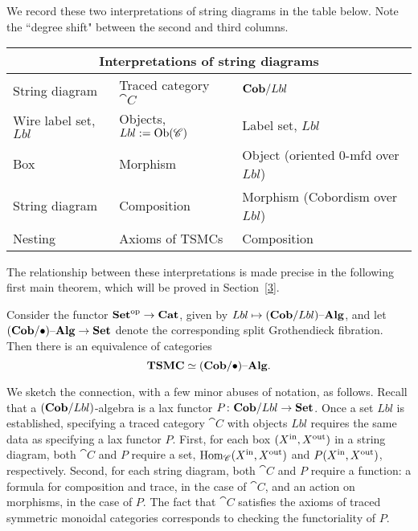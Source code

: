We record these two interpretations of string diagrams in the table below. Note the ``degree shift" between the second and third columns.
\begin{center}
\begin{tabular}{lll}
\toprule
\multicolumn{3}{c}{Interpretations of string diagrams} \\
\midrule
String diagram & Traced category $\cat{C}$ & $\mathbf{Cob}/Lbl$ \\
\midrule
Wire label set, $Lbl$ & Objects, $Lbl:=\operatorname{Ob}(\mathscr{C})$ & Label set, $Lbl$ \\
Box & Morphism & Object (oriented 0-mfd over $Lbl$) \\
String diagram & Composition & Morphism (Cobordism over $Lbl$) \\
Nesting & Axioms of TSMCs & Composition \\
\bottomrule
\end{tabular}
\end{center}

The relationship between these interpretations is made precise in the following first main theorem, which will be proved in Section~\ref{3}.
\begin{theorem}\label{thm:traced as cob-alg}
Consider the functor ${\mathbf{Set}}^{\text{op}}\to\mathbf{Cat}$, given by $Lbl\mapsto(\mathbf{Cob}/Lbl){\text \textendash}\mathbf{Alg}$, and let $(\mathbf{Cob}/\bullet){\text \textendash}\mathbf{Alg}\to\mathbf{Set}$ denote the corresponding split Grothendieck fibration. Then there is an equivalence of categories
$$\mathbf{TSMC}\simeq(\mathbf{Cob}/\bullet){\text \textendash}\mathbf{Alg}.$$
\end{theorem}

We sketch the connection, with a few minor abuses of notation, as follows. Recall that a $(\mathbf{Cob}/Lbl)$-algebra is a lax functor $P\colon\mathbf{Cob}/Lbl\to\mathbf{Set}$. Once a set $Lbl$ is established, specifying a traced category $\cat{C}$ with objects $Lbl$ requires the same data as specifying a lax functor $P$. First, for each box $(X^{\text{in}},X^{\text{out}})$ in a string diagram, both $\cat{C}$ and $P$ require a set, $\operatorname{Hom}_{\mathscr{C}}(X^{\text{in}},X^{\text{out}})$ and $P(X^{\text{in}},X^{\text{out}})$, respectively.  Second, for each string diagram, both $\cat{C}$ and $P$ require a function: a formula for composition and trace, in the case of $\cat{C}$, and an action on morphisms, in the case of $P$. The fact that $\cat{C}$ satisfies the axioms of traced symmetric monoidal categories corresponds to checking the functoriality of $P$.

